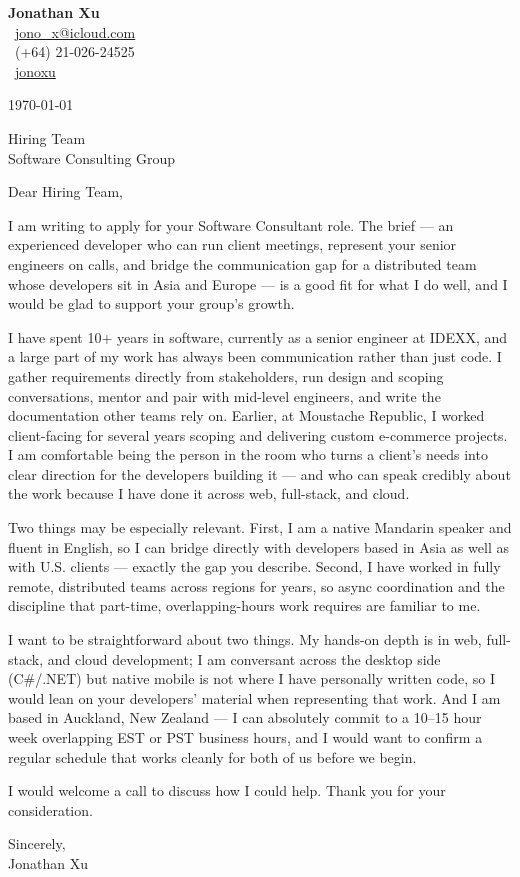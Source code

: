 \documentclass[11pt,a4paper]{article}
\begin{document}
\begin{flushright}
{\Large\textbf{Jonathan Xu}}\\[0.3em]
\faEnvelope\ \href{mailto:jono_x@icloud.com}{jono\_x@icloud.com} \\
\faPhone\ (+64) 21-026-24525 \\
\faLinkedin\ \href{https://www.linkedin.com/in/jonathan-x-4aba55115}{jonoxu}
\end{flushright}

\vspace{0.5em}

\today

\vspace{0.5em}

Hiring Team \\
Software Consulting Group

\vspace{0.5em}

Dear Hiring Team,

I am writing to apply for your Software Consultant role. The brief — an experienced developer who can run client meetings, represent your senior engineers on calls, and bridge the communication gap for a distributed team whose developers sit in Asia and Europe — is a good fit for what I do well, and I would be glad to support your group's growth.

I have spent 10+ years in software, currently as a senior engineer at IDEXX, and a large part of my work has always been communication rather than just code. I gather requirements directly from stakeholders, run design and scoping conversations, mentor and pair with mid-level engineers, and write the documentation other teams rely on. Earlier, at Moustache Republic, I worked client-facing for several years scoping and delivering custom e-commerce projects. I am comfortable being the person in the room who turns a client's needs into clear direction for the developers building it — and who can speak credibly about the work because I have done it across web, full-stack, and cloud.

Two things may be especially relevant. First, I am a native Mandarin speaker and fluent in English, so I can bridge directly with developers based in Asia as well as with U.S. clients — exactly the gap you describe. Second, I have worked in fully remote, distributed teams across regions for years, so async coordination and the discipline that part-time, overlapping-hours work requires are familiar to me.

I want to be straightforward about two things. My hands-on depth is in web, full-stack, and cloud development; I am conversant across the desktop side (C\#/.NET) but native mobile is not where I have personally written code, so I would lean on your developers' material when representing that work. And I am based in Auckland, New Zealand — I can absolutely commit to a 10–15 hour week overlapping EST or PST business hours, and I would want to confirm a regular schedule that works cleanly for both of us before we begin.

I would welcome a call to discuss how I could help. Thank you for your consideration.

\vspace{0.5em}

Sincerely, \\
Jonathan Xu
\end{document}
